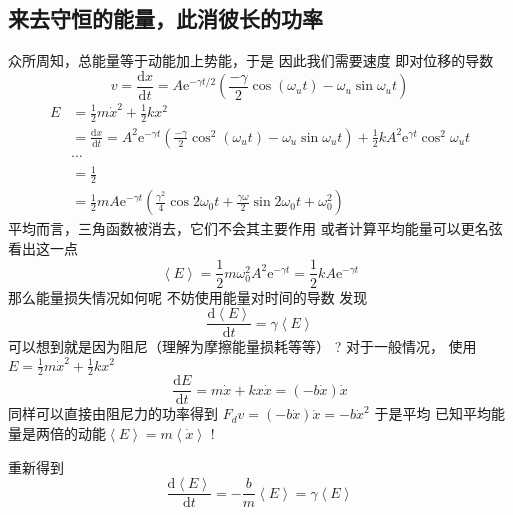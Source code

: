 \documentclass[11pt]{book}
\begin{document}
\subsection{来去守恒的能量，此消彼长的功率}
\label{sec:org9955cb7}
众所周知，总能量等于动能加上势能，于是
因此我们需要速度
即对位移的导数
\begin{equation}
\label{eq:48}
v=\frac{\mathrm{d}x}{\mathrm{d}t}=A\mathrm{e}^{-\gamma t/2}(\frac{-\gamma}{2}\cos(\omega_u t)-\omega_u\sin\omega_ut)
\end{equation}
\begin{equation}
\label{eq:47}
\begin{split}
E &= \frac{1}{2}m\dot{x}^2+\frac{1}{2}kx^2\\
&= \frac{\mathrm{d}x}{\mathrm{d}t}=A^2\mathrm{e}^{-\gamma t}(\frac{-\gamma}{2}\cos^{2}(\omega_u t)-\omega_u\sin\omega_ut)+\frac{1}{2}kA^2\mathrm{e}^{\gamma t}\cos^2\omega_u t \\
&\cdots\\
&=\frac{1}{2}\\
&=\frac{1}{2}mA\mathrm{e}^{-\gamma t}(\frac{\gamma^2}{4}\cos2\omega_{0}t+\frac{\gamma\omega}{2}\sin2\omega_{0}t+\omega_0^2)
\end{split}
\end{equation}
平均而言，三角函数被消去，它们不会其主要作用
或者计算平均能量可以更名弦看出这一点
\begin{equation}
\label{eq:49}
\left\langle E \right\rangle=\frac{1}{2}m\omega_0^2A^2\mathrm{e}^{-\gamma t}=\frac{1}{2}kA\mathrm{e}^{-\gamma t}
\end{equation}
那么能量损失情况如何呢
不妨使用能量对时间的导数
发现
\begin{equation}
\label{eq:50}
\frac{\mathrm{d}\left\langle E \right\rangle}{\mathrm{d}t}=\gamma \left\langle E \right\rangle
\end{equation}
可以想到就是因为阻尼（理解为摩擦能量损耗等等）
?
对于一般情况，
使用 \(E = \frac{1}{2}m\dot{x}^2+\frac{1}{2}kx^2\)
\begin{equation}
\label{eq:51}
\frac{\mathrm{d}E}{\mathrm{d}t}=m\dot{x}+kx\dot{x}=(-b\dot{x})\dot{x}
\end{equation}
同样可以直接由阻尼力的功率得到
\(F_dv=(-b\dot{x})\dot{x}=-b\dot{x}^2\)
于是平均
已知平均能量是两倍的动能\(\left\langle E \right\rangle=m \left\langle \dot{x} \right\rangle\) !

重新得到$$\frac{\mathrm{d}\left\langle E \right\rangle}{\mathrm{d}t}=-\frac{b}{m}\left\langle E \right\rangle =\gamma \left\langle E \right\rangle$$
\end{document}
